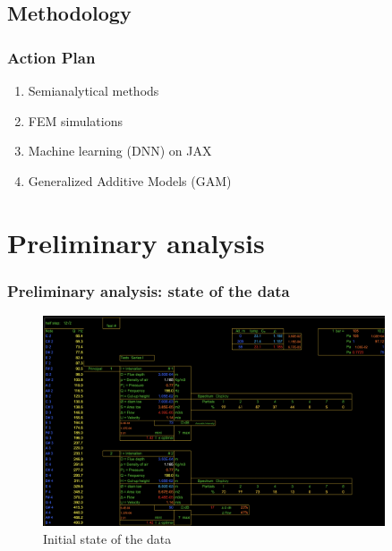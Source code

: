 \documentclass{beamer}
\begin{document}
    \subsection{Methodology}
    \begin{frame}
        \frametitle{Action Plan}
        \begin{enumerate}
            \item Semianalytical methods
            \item FEM simulations
            \item Machine learning (DNN) on JAX
            \item Generalized Additive Models (GAM)
        \end{enumerate}
    \end{frame}

    \section{Preliminary analysis}
    \begin{frame}
        \frametitle{Preliminary analysis: state of the data}
                \centering
                \begin{figure}[htbp]
                    \includegraphics[width=0.9\textwidth]{pic1.png}
                    \caption{Initial state of the data}
                    \label{fig:initial_state}
                \end{figure}
    \end{frame}
\end{document}
